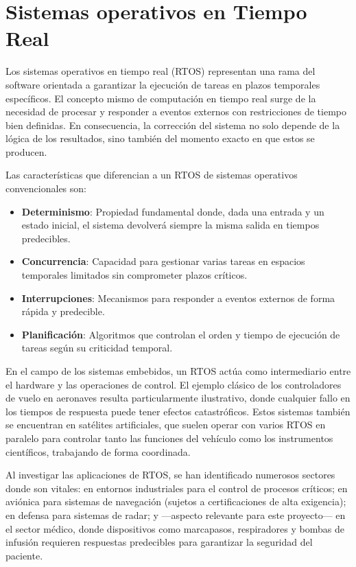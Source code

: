 \chapter{Sistemas operativos en Tiempo Real}\label{ch:real_time_oses}

Los sistemas operativos en tiempo real (RTOS) \cite{Siewert_Pratt_2016} representan una rama del software orientada a garantizar la ejecución de tareas en plazos temporales específicos. El concepto mismo de computación en tiempo real surge de la necesidad de procesar y responder a eventos externos con restricciones de tiempo bien definidas. En consecuencia, la corrección del sistema no solo depende de la lógica de los resultados, sino también del momento exacto en que estos se producen.

Las características que diferencian a un RTOS de sistemas operativos convencionales son:

\begin{itemize}
    \item \textbf{Determinismo}: Propiedad fundamental donde, dada una entrada y un estado inicial, el sistema devolverá siempre la misma salida en tiempos predecibles.
    \item \textbf{Concurrencia}: Capacidad para gestionar varias tareas en espacios temporales limitados sin comprometer plazos críticos.
    \item \textbf{Interrupciones}: Mecanismos para responder a eventos externos de forma rápida y predecible.
    \item \textbf{Planificación}: Algoritmos que controlan el orden y tiempo de ejecución de tareas según su criticidad temporal.
\end{itemize}

En el campo de los sistemas embebidos, un RTOS actúa como intermediario entre el hardware y las operaciones de control. El ejemplo clásico de los controladores de vuelo en aeronaves resulta particularmente ilustrativo, donde cualquier fallo en los tiempos de respuesta puede tener efectos catastróficos. Estos sistemas también se encuentran en satélites artificiales, que suelen operar con varios RTOS en paralelo para controlar tanto las funciones del vehículo como los instrumentos científicos, trabajando de forma coordinada.

Al investigar las aplicaciones de RTOS, se han identificado numerosos sectores donde son vitales: en entornos industriales para el control de procesos críticos; en aviónica para sistemas de navegación (sujetos a certificaciones de alta exigencia); en defensa para sistemas de radar; y —aspecto relevante para este proyecto— en el sector médico, donde dispositivos como marcapasos, respiradores y bombas de infusión requieren respuestas predecibles para garantizar la seguridad del paciente.

